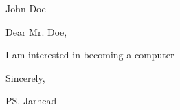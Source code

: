 \documentclass[14pt]{letter}
\begin{document}
    \begin{letter}{John Doe}
        \opening{Dear Mr. Doe,}

        I am interested in becoming a computer
        \closing{Sincerely,}
        \ps{Jarhead}
    \end{letter}
\end{document}
